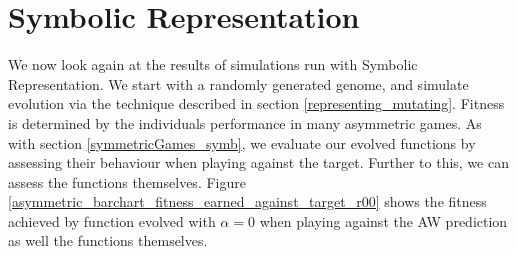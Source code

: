 \documentclass[11pt]{book}
\begin{document}
\section{Symbolic Representation}\label{asymmetricGames_symb}
We now look again at the results of simulations run with Symbolic Representation.
We start with a randomly generated genome, and simulate evolution via the technique described in section \ref{representing_mutating}.
Fitness is determined by the individuals performance in many asymmetric games.
As with section \ref{symmetricGames_symb}, we evaluate our evolved functions by assessing their behaviour when playing against the target.
Further to this, we can assess the functions themselves.
Figure \ref{asymmetric_barchart_fitness_earned_against_target_r00} shows the fitness achieved by function evolved with $\alpha = 0$ when playing against the AW prediction as well the functions themselves.
\end{document}
